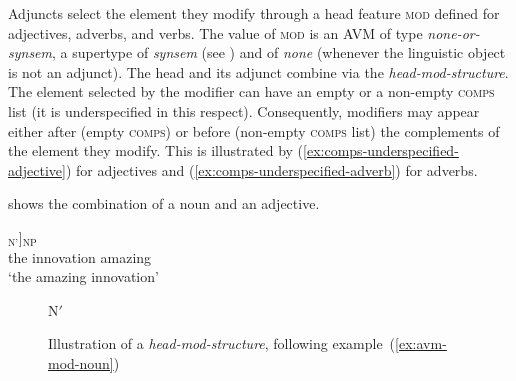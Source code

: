 Adjuncts select the element they modify through a head feature \textsc{mod} defined for adjectives, adverbs, and verbs. The value of \textsc{mod} is an AVM of type \emph{none-or-synsem}, a supertype of \emph{synsem} (see ) and of \emph{none} (whenever the linguistic object is not an adjunct). The head and its adjunct combine via the \emph{head-mod-structure}. The element selected by the modifier can have an empty or a non-empty \textsc{comps} list (it is underspecified in this respect). Consequently, modifiers may appear either after (empty \textsc{comps}) or before (non-empty \textsc{comps} list) the complements of the element they modify. This is illustrated by (\ref{ex:comps-underspecified-adjective}) for adjectives and (\ref{ex:comps-underspecified-adverb}) for adverbs.

\eal\label{ex:comps-underspecified-adjective} 
\zl 

\eal\label{ex:comps-underspecified-adverb} 
\zl 

 shows the combination of a noun and an adjective.

\ea \label{ex:avm-mod-noun}
\gll [l' [innovation formidable]$_{\text{N'}}$]$_{\text{NP}}$\\
\sbar{}the \sbar{}innovation amazing\\
\glt `the amazing innovation'
\z

\begin{figure}[h]
N$'$ 
\caption{Illustration of a \textit{head-mod-structure}, following example~(\ref{ex:avm-mod-noun})}
\label{fig:new:ex:avm-mod-noun-b}
\end{figure}


